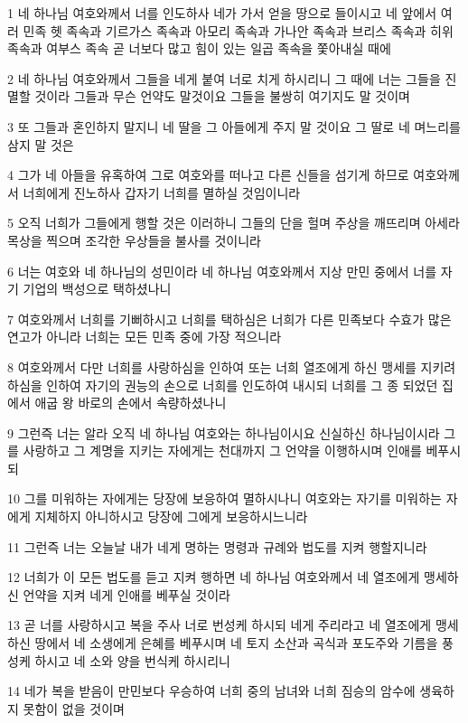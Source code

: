\par 1 네 하나님 여호와께서 너를 인도하사 네가 가서 얻을 땅으로 들이시고 네 앞에서 여러 민족 헷 족속과 기르가스 족속과 아모리 족속과 가나안 족속과 브리스 족속과 히위 족속과 여부스 족속 곧 너보다 많고 힘이 있는 일곱 족속을 쫓아내실 때에
\par 2 네 하나님 여호와께서 그들을 네게 붙여 너로 치게 하시리니 그 때에 너는 그들을 진멸할 것이라 그들과 무슨 언약도 말것이요 그들을 불쌍히 여기지도 말 것이며
\par 3 또 그들과 혼인하지 말지니 네 딸을 그 아들에게 주지 말 것이요 그 딸로 네 며느리를 삼지 말 것은
\par 4 그가 네 아들을 유혹하여 그로 여호와를 떠나고 다른 신들을 섬기게 하므로 여호와께서 너희에게 진노하사 갑자기 너희를 멸하실 것임이니라
\par 5 오직 너희가 그들에게 행할 것은 이러하니 그들의 단을 헐며 주상을 깨뜨리며 아세라 목상을 찍으며 조각한 우상들을 불사를 것이니라
\par 6 너는 여호와 네 하나님의 성민이라 네 하나님 여호와께서 지상 만민 중에서 너를 자기 기업의 백성으로 택하셨나니
\par 7 여호와께서 너희를 기뻐하시고 너희를 택하심은 너희가 다른 민족보다 수효가 많은 연고가 아니라 너희는 모든 민족 중에 가장 적으니라
\par 8 여호와께서 다만 너희를 사랑하심을 인하여 또는 너희 열조에게 하신 맹세를 지키려 하심을 인하여 자기의 권능의 손으로 너희를 인도하여 내시되 너희를 그 종 되었던 집에서 애굽 왕 바로의 손에서 속량하셨나니
\par 9 그런즉 너는 알라 오직 네 하나님 여호와는 하나님이시요 신실하신 하나님이시라 그를 사랑하고 그 계명을 지키는 자에게는 천대까지 그 언약을 이행하시며 인애를 베푸시되
\par 10 그를 미워하는 자에게는 당장에 보응하여 멸하시나니 여호와는 자기를 미워하는 자에게 지체하지 아니하시고 당장에 그에게 보응하시느니라
\par 11 그런즉 너는 오늘날 내가 네게 명하는 명령과 규례와 법도를 지켜 행할지니라
\par 12 너희가 이 모든 법도를 듣고 지켜 행하면 네 하나님 여호와께서 네 열조에게 맹세하신 언약을 지켜 네게 인애를 베푸실 것이라
\par 13 곧 너를 사랑하시고 복을 주사 너로 번성케 하시되 네게 주리라고 네 열조에게 맹세하신 땅에서 네 소생에게 은혜를 베푸시며 네 토지 소산과 곡식과 포도주와 기름을 풍성케 하시고 네 소와 양을 번식케 하시리니
\par 14 네가 복을 받음이 만민보다 우승하여 너희 중의 남녀와 너희 짐승의 암수에 생육하지 못함이 없을 것이며
